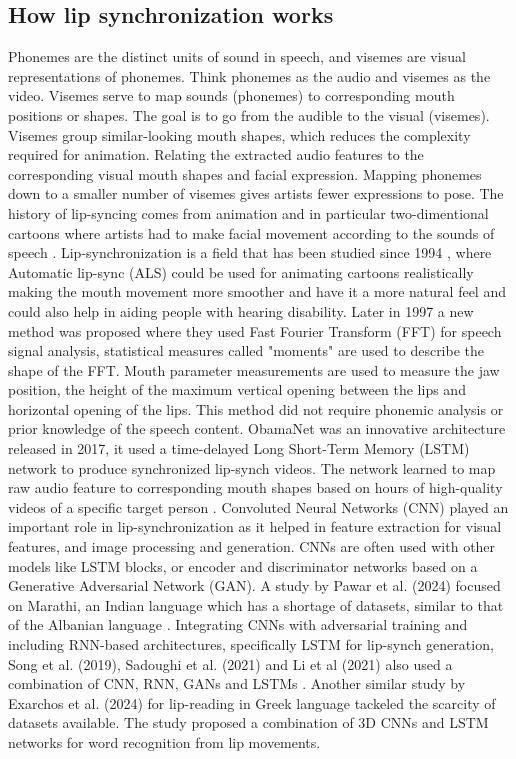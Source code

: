 \documentclass[12pt]{article}
\begin{document}
\subsection{How lip synchronization works}
Phonemes are the distinct units of sound in speech, and visemes are visual representations of phonemes. Think phonemes as the audio and visemes as the video. Visemes serve to map sounds (phonemes) to corresponding mouth positions or shapes. The goal is to go from the audible  to the visual (visemes). Visemes group similar-looking mouth shapes, which reduces the complexity required for animation. Relating the extracted audio features to the corresponding visual mouth shapes and facial expression. Mapping phonemes down to a smaller number of visemes gives artists fewer expressions to pose. The history of lip-syncing comes from animation and in particular two-dimentional cartoons where artists had to make facial movement according to the sounds of speech \cite{game-lipsynch}. Lip-synchronization is a field that has been studied since 1994 \cite{earliest-lip-synch}, where Automatic lip-sync (ALS) could be used for animating cartoons realistically making the mouth movement more smoother and have it a more natural feel and could also help in aiding people with hearing disability. Later in 1997 a new method was proposed where they used Fast Fourier Transform (FFT) for speech signal analysis, statistical measures called "moments" are used to describe the shape of the FFT. Mouth parameter measurements are used to measure the jaw position, the height of the maximum vertical opening between the lips and horizontal opening of the lips. This method did not require phonemic analysis or prior knowledge of the speech content. ObamaNet was an innovative architecture released in 2017, it used a time-delayed Long Short-Term Memory (LSTM) network to produce synchronized lip-synch videos. The network learned to map raw audio feature to corresponding mouth shapes based on hours of high-quality videos of a specific target person \cite{ObamaNet}. Convoluted Neural Networks (CNN) played an important role in lip-synchronization as it helped in feature extraction for visual features, and image processing and generation. CNNs are often used with other models like LSTM blocks, or encoder and discriminator networks based on a Generative Adversarial Network (GAN). A study by Pawar et al. (2024) focused on Marathi, an Indian language which has a shortage of datasets, similar to that of the Albanian language \cite{PAWAR2024100084}. Integrating CNNs with adversarial training and including RNN-based architectures, specifically LSTM for lip-synch generation, Song et al. (2019), Sadoughi et al. (2021) and Li et al (2021) also used a combination of CNN, RNN, GANs and LSTMs \cite{Audio-driven-facial-animation} \cite{Li_2021}. Another similar study by Exarchos et al. (2024) for lip-reading in Greek language tackeled the scarcity of datasets available. The study proposed a combination of 3D CNNs and LSTM networks for word recognition from lip movements.  
\end{document}
